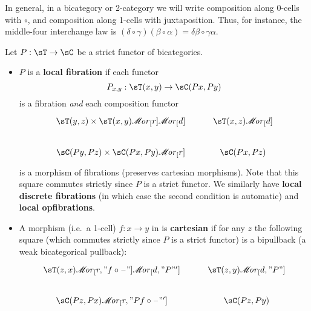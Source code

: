\documentclass{amsart}
\def\ar#1{\mathscr{M}\!\mathit{or}_{#1}}
\begin{document}
In general, in a bicategory or 2-category we will write composition along 0-cells with $\circ$, and composition along 1-cells with juxtaposition.
Thus, for instance, the middle-four interchange law is $(\delta\circ\gamma)(\beta\circ \alpha) = \delta\beta\circ \gamma\alpha$.

\begin{defn}
  Let $P:\sT\to\sC$ be a strict functor of bicategories.
  \begin{itemize}
  \item $P$ is a \textbf{local fibration} if each functor
    \[ P_{x,y}:\sT(x,y) \to \sC(Px,Py) \]
    is a fibration \emph{and} each composition functor
    \[
    \begin{tikzcd}
      \sT(y,z) \times \sT(x,y) \ar[r] \ar[d] & \sT(x,z) \ar[d] \\
      \sC(Py,Pz) \times \sC(Px,Py) \ar[r] & \sC(Px,Pz)
    \end{tikzcd}
    \]
    is a morphism of fibrations (preserves cartesian morphisms).
    Note that this square commutes strictly since $P$ is a strict functor.
    We similarly have \textbf{local discrete fibrations} (in which case the second condition is automatic) and \textbf{local opfibrations}.
  \item A morphism (i.e.\ a 1-cell) $f:x\to y$ in \sC is \textbf{cartesian} if for any $z$ the following square (which commutes strictly since $P$ is a strict functor) is a bipullback (a weak bicategorical pullback):
    \[
    \begin{tikzcd}
      \sT(z,x) \ar[r,"f\circ\blank"]\ar[d,"P"'] & \sT(z,y) \ar[d,"P"]\\
      \sC(Pz,Px) \ar[r,"Pf\circ \blank"'] & \sC(Pz,Py)
    \end{tikzcd}
    \]

\end{itemize}
\end{defn}
\end{document}

